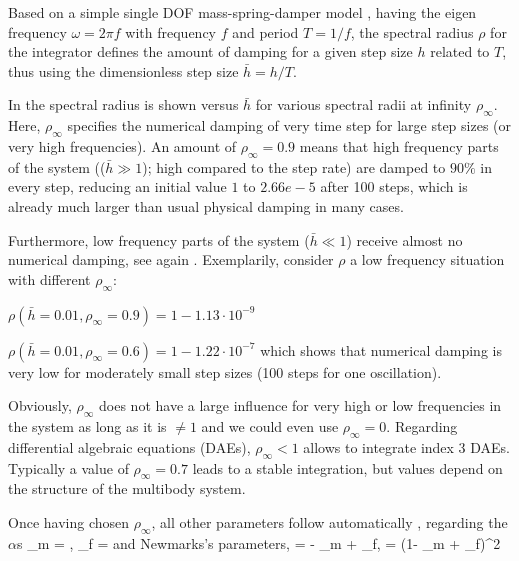 Based on a simple single DOF mass-spring-damper model \cite{Bauchau2011}, having the eigen frequency $\omega = 2\pi f$ with frequency $f$ and period $T=1/f$, the spectral radius $\rho$ for the integrator defines the amount of damping for a given step size $h$ related to $T$, thus using the dimensionless step size $\bar h=h/T$.

In  the spectral radius is shown versus $\bar h$ for various spectral radii at infinity $\rho_\infty$. 
Here, $\rho_\infty$ specifies the numerical damping of very time step for large step sizes (or very high frequencies). An amount of $\rho_\infty=0.9$ means that high frequency parts of the system (($\bar h \gg 1$); high compared to the step rate) are damped to $90\%$ in every step, reducing an initial value $1$ to $2.66e-5$ after 100 steps, which is already much larger than usual physical damping in many cases.

Furthermore, low frequency parts of the system ($\bar h \ll 1$) receive almost no numerical damping, see again . 
Exemplarily, consider $\rho$ a low frequency situation with different $\rho_\infty$:
\bi
  \item $\rho(\bar h=0.01, \rho_\infty=0.9) = 1 - 1.13\cdot 10^{-9}$
	\item $\rho(\bar h=0.01, \rho_\infty=0.6) = 1 - 1.22\cdot 10^{-7}$
\ei
which shows that numerical damping is very low for moderately small step sizes (100 steps for one oscillation).

Obviously, $\rho_\infty$ does not have a large influence for very high or low frequencies in the system as long as it is $\neq 1$ and we could even use $\rho_\infty=0$.
Regarding differential algebraic equations (DAEs), $\rho_\infty<1$ allows to integrate index 3 DAEs. Typically a value of $\rho_\infty=0.7$ leads to a stable integration, but values depend on the structure of the multibody system.

Once having chosen $\rho_\infty$, all other parameters follow automatically \cite{Chung1993}, regarding the $\alpha$s
\be
	\alpha_m = , \quad
	\alpha_f = 
\ee
and Newmarks's parameters,
\be
	\gamma =  - \alpha_m + \alpha_f, \quad 
	\beta = (1- \alpha_m + \alpha_f)^2
\ee

